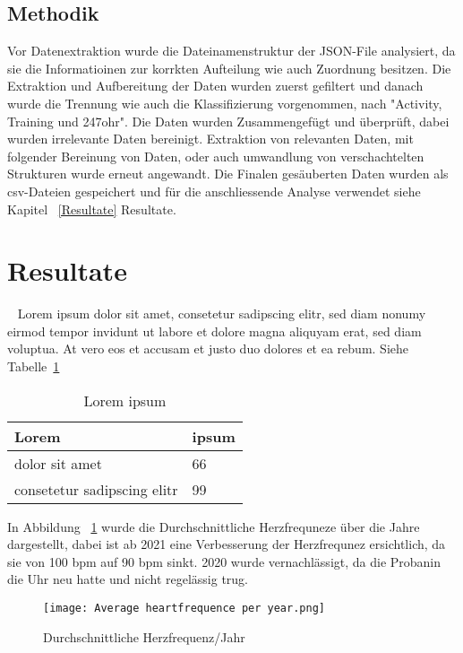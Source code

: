 \documentclass[a4paper,12pt]{scrartcl}
\begin{document}


\subsection{Methodik} 
\label{Methodik}
Vor Datenextraktion wurde die Dateinamenstruktur der JSON-File analysiert, da sie die Informatioinen zur korrkten Aufteilung wie auch Zuordnung besitzen. Die Extraktion und Aufbereitung der Daten wurden zuerst gefiltert und danach wurde die Trennung wie auch die Klassifizierung vorgenommen, nach "Activity, Training und 247ohr". Die Daten wurden Zusammengefügt und überprüft, dabei wurden irrelevante Daten bereinigt. Extraktion von relevanten Daten, mit folgender Bereinung von Daten, oder auch umwandlung von verschachtelten Strukturen wurde erneut angewandt.
Die Finalen gesäuberten Daten wurden als csv-Dateien gespeichert und für die anschliessende Analyse verwendet siehe Kapitel ~\ref{Resultate} Resultate.

\section{Resultate}~\label{Resultate}
Lorem ipsum dolor sit amet, consetetur sadipscing elitr, sed diam nonumy eirmod tempor invidunt ut labore et dolore magna aliquyam erat, sed diam voluptua. At vero eos et accusam et justo duo dolores et ea rebum. Siehe Tabelle~\ref{tab:lorem}

\begin{table}[ht]
\centering
\begin{tabular}{l l}
Lorem & ipsum \\\hline
dolor sit amet & 66 \\
consetetur sadipscing elitr & 99 \\
\end{tabular}
\caption{Lorem ipsum}
\label{tab:lorem}
\end{table}

In Abbildung ~\ref{fig:av. heart per year} wurde die Durchschnittliche Herzfrequneze über die Jahre dargestellt, dabei ist ab 2021 eine Verbesserung der Herzfrequnez ersichtlich, da sie von 100 bpm auf 90 bpm sinkt. 2020 wurde vernachlässigt, da die Probanin die Uhr neu hatte und nicht regelässig trug.


\begin{figure}
    \centering
    \texttt{[image: Average heartfrequence per year.png]}
    \caption{Durchschnittliche Herzfrequenz/Jahr}
    \label{fig:av. heart per year}
\end{figure}
\end{document}
